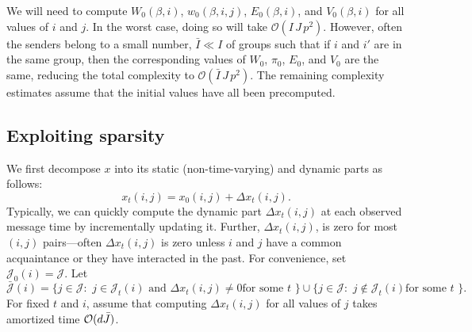 \documentclass[final]{statsoc}
\begin{document}
We will need to compute $W_0(\beta, i)$, $w_0(\beta, i, j)$, $E_0(\beta,
i)$, and $V_0(\beta, i)$ for all values of $i$ and $j$.  In the worst case,
doing so will take $\mathcal{O}(I \, J \, p^2)$.  However, often the senders
belong to a small number, $\bar I \ll I$ of groups such that if $i$ and $i'$
are in the same group, then the corresponding values of $W_0$, $\pi_0$, $E_0$,
and $V_0$ are the same, reducing the total complexity to $\mathcal{O}(\bar I
\, J \, p^2)$.  The remaining complexity estimates assume that the
initial values have all been precomputed.


\subsection{Exploiting sparsity}

We first decompose $x$ into its static (non-time-varying) and dynamic parts as follows:
\begin{equation}\label{E:x-static-dynamic}
    x_t(i,j)
        = x_0(i,j) + \Delta x_t(i,j).
\end{equation}
Typically, we can quickly compute the dynamic part $\Delta x_t(i,j)$ at
each observed message time by incrementally updating it.  Further, $\Delta
x_t(i,j)$, is zero for most $(i,j)$ pairs---often $\Delta x_t(i,j)$ is zero
unless $i$ and $j$ have a common acquaintance or they have interacted in the
past.
For convenience, set $\mathcal{J}_0(i) = \mathcal{J}$.  Let
\begin{equation*}
    \mathcal{\bar J}(i)
        =
            \{
                j \in \mathcal{J} :
                \text{
                    $j \in \mathcal{J}_t(i)$ and $\Delta x_t(i,j) \neq 0$
                    for some $t$
                }
            \}
        \cup
            \{
                j \in \mathcal{J} :
                \text{
                    $j \notin \mathcal{J}_t(i)$
                    for some $t$
                }
            \}.
\end{equation*}
For fixed $t$ and $i$, assume that computing
$\Delta x_t(i,j)$ for all values of $j$ takes amortized time $\mathcal{O}(d \bar J)$.
\end{document}

